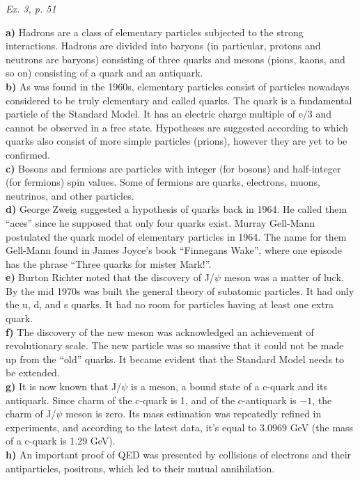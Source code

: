 \documentclass[a4paper, 12pt]{article}
\def\task#1{\begin{center}\it #1\end{center}}
\newif\ifcols
\begin{document}
\task{Ex. 3, p. 51}
\ifcols\begin{multicols}{2}\fi%
\textbf{a)} Hadrons are a class of elementary particles subjected to the strong interactions. Hadrons are divided into baryons (in particular, protons and neutrons are baryons) consisting of three quarks and mesons (pions, kaons, and so on) consisting of a quark and an antiquark.
\\\textbf{b)} As was found in the 1960s, elementary particles consist of particles nowadays considered to be truly elementary and called quarks. The quark is a fundamental particle of the Standard Model. It has an electric charge multiple of e/3 and cannot be observed in a free state. Hypotheses are suggested according to which quarks also consist of more simple particles (prions), however they are yet to be confirmed.
\\\textbf{c)} Bosons and fermions are particles with integer (for bosons) and half-integer (for fermions) spin values. Some of fermions are quarks, electrons, muons, neutrinos, and other particles.
\\\textbf{d)} George Zweig suggested a hypothesis of quarks back in 1964. He called them ``aces'' since he supposed that only four quarks exist. Murray Gell-Mann postulated the quark model of elementary particles in 1964. The name for them Gell-Mann found in James Joyce's book ``Finnegans Wake'', where one episode has the phrase ``Three quarks for mister Mark!''.
\\\textbf{e)} Burton Richter noted that the discovery of J/$\psi$ meson was a matter of luck. By the mid 1970s was built the general theory of subatomic particles. It had only the u, d, and s quarks. It had no room for particles having at least one extra quark.
\\\textbf{f)} The discovery of the new meson was acknowledged an achievement of revolutionary scale. The new particle was so massive that it could not be made up from the ``old'' quarks. It became evident that the Standard Model needs to be extended.
\\\textbf{g)} It is now known that J/$\psi$ is a meson, a bound state of a c-quark and its antiquark. Since charm of the c-quark is 1, and of the c-antiquark is $-1$, the charm of J/$\psi$ meson is zero. Its mass estimation was repeatedly refined in experiments, and according to the latest data, it's equal to 3.0969 GeV (the mass of a c-quark is 1.29 GeV).
\\\textbf{h)} An important proof of QED was presented by collisions of electrons and their antiparticles, positrons, which led to their mutual annihilation.
\ifcols\end{multicols}\fi%
\end{document}
